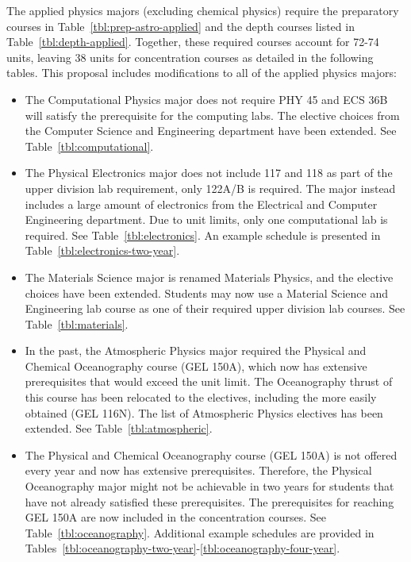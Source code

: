 \documentclass[12pt]{article}
\begin{document}
The applied physics majors (excluding chemical physics) require the
preparatory courses in Table~\ref{tbl:prep-astro-applied} and the
depth courses listed in Table~\ref{tbl:depth-applied}.  Together,
these required courses account for 72-74 units, leaving 38 units for
concentration courses as detailed in the following tables.  This
proposal includes modifications to all of the applied physics majors:
\begin{itemize}

  \item The Computational Physics major does not require PHY 45 and ECS
  36B will satisfy the prerequisite for the computing labs.  The
  elective choices from the Computer Science and Engineering
  department have been extended.  See Table~\ref{tbl:computational}.

\item The Physical Electronics major does not include 117 and 118 as
  part of the upper division lab requirement, only 122A/B is required.
  The major instead includes a large amount of electronics from the
  Electrical and Computer Engineering department.  Due to unit limits,
  only one computational lab is required.  See
  Table~\ref{tbl:electronics}.  An example schedule is presented in
  Table~\ref{tbl:electronics-two-year}.

\item The Materials Science major is renamed Materials Physics, and
  the elective choices have been extended.  Students may now use a
  Material Science and Engineering lab course as one of their required
  upper division lab courses.  See Table~\ref{tbl:materials}.

\item In the past, the Atmospheric Physics major required the Physical
  and Chemical Oceanography course (GEL 150A), which now has extensive
  prerequisites that would exceed the unit limit.  The Oceanography
  thrust of this course has been relocated to the electives, including
  the more easily obtained (GEL 116N).  The list of Atmospheric
  Physics electives has been extended.  See
  Table~\ref{tbl:atmospheric}.

\item The Physical and Chemical Oceanography course (GEL 150A) is not
  offered every year and now has extensive prerequisites.  Therefore,
  the Physical Oceanography major might not be achievable in two years
  for students that have not already satisfied these prerequisites.
  The prerequisites for reaching GEL 150A are now included in the
  concentration courses.  See Table~\ref{tbl:oceanography}.
  Additional example schedules are provided in
  Tables~\ref{tbl:oceanography-two-year}-\ref{tbl:oceanography-four-year}.
  

\end{itemize}
\end{document}
